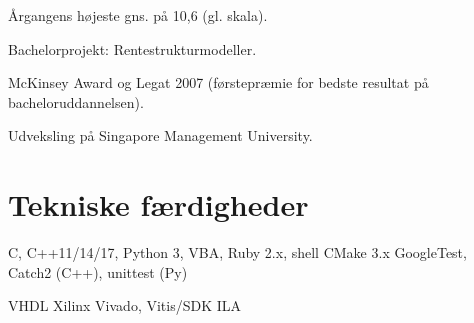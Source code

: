 \documentclass[a4paper]{janus-resume} %
\begin{document}
\begin{minipage}[t]{0.49\textwidth}
\sectionspace %

Årgangens højeste gns. på 10,6 (gl. skala).
\begin{tightitemize}
\item Bachelorprojekt: Rentestrukturmodeller. \\
\item McKinsey Award og Legat 2007 (førstepræmie for bedste resultat på bacheloruddannelsen). \\
\item Udveksling på Singapore Management University. \\
\end{tightitemize}

\sectionspace %




\sectionspace %


\section{Tekniske færdigheder}


C, C++11/14/17, Python 3, VBA, Ruby 2.x, shell 
\textbullet{} CMake 3.x 
\textbullet{} GoogleTest, Catch2 (C++), unittest (Py) \\
\sectionspace %

VHDL 
\textbullet{} Xilinx Vivado, Vitis/SDK
\textbullet{} ILA \\
\sectionspace %


\end{minipage}
\end{document}
